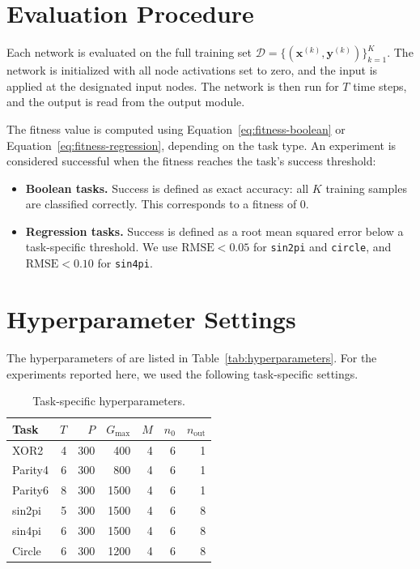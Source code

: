 \section{Evaluation Procedure}
\label{sec:evaluation}

Each network is evaluated on the full training set
$\mathcal{D} = \{(\mathbf{x}^{(k)}, \mathbf{y}^{(k)})\}_{k=1}^{K}$.
The network is initialized with all node activations set to zero, and
the input is applied at the designated input nodes. The network is
then run for $T$ time steps, and the output is read from the output
module.

The fitness value is computed using Equation~\ref{eq:fitness-boolean}
or Equation~\ref{eq:fitness-regression}, depending on the task type.
An experiment is considered successful when the fitness reaches the
task's success threshold:

\begin{itemize}
  \item \textbf{Boolean tasks.} Success is defined as exact accuracy:
    all $K$ training samples are classified correctly. This
    corresponds to a fitness of $0$.
  \item \textbf{Regression tasks.} Success is defined as a root mean
    squared error below a task-specific threshold. We use
    $\text{RMSE} < 0.05$ for \texttt{sin2pi} and \texttt{circle}, and
    $\text{RMSE} < 0.10$ for \texttt{sin4pi}.
\end{itemize}

\section{Hyperparameter Settings}
\label{sec:hp-settings}

The hyperparameters of \modnet{} are listed in Table~\ref{tab:hyperparameters}.
For the experiments reported here, we used the following task-specific
settings.

\begin{table}[h]
  \centering
  \small
  \caption{Task-specific hyperparameters.}
  \label{tab:task-hp}
  \begin{tabular}{lrrrrrr}
    \toprule
    \textbf{Task} & $T$ & $P$ & $G_{\max}$ & $M$ & $n_0$ & $n_{\text{out}}$ \\
    \midrule
    XOR2      & 4  & 300 & 400  & 4 & 6 & 1 \\
    Parity4   & 6  & 300 & 800  & 4 & 6 & 1 \\
    Parity6   & 8  & 300 & 1500 & 4 & 6 & 1 \\
    sin2pi    & 5  & 300 & 1500 & 4 & 6 & 8 \\
    sin4pi    & 6  & 300 & 1500 & 4 & 6 & 8 \\
    Circle    & 6  & 300 & 1200 & 4 & 6 & 8 \\
    \bottomrule
  \end{tabular}
\end{table}

